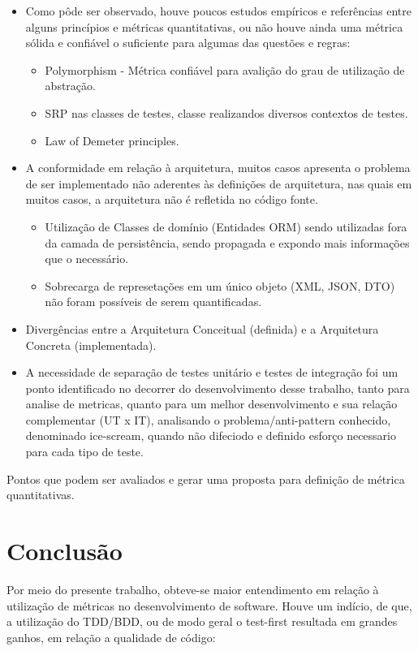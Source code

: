 \documentclass[12pt]{article}
\begin{document}
 \begin{itemize}
 	\item Como  pôde  ser  observado,  houve  poucos  estudos  empíricos e referências entre alguns princípios e métricas quantitativas, ou não houve ainda uma métrica sólida e confiável o suficiente para algumas das questões e regras:
		\begin{itemize}
		 \item Polymorphism - Métrica confiável para avalição do grau de utilização de abstração.
		 \item  SRP nas classes de testes, classe realizandos diversos contextos de testes.
		 \item Law of Demeter principles.
		\end{itemize}
	\item A conformidade em relação à arquitetura, muitos casos apresenta  o problema de ser implementado não aderentes às definições de arquitetura, nas quais  em  muitos  casos, a  arquitetura não é refletida no código fonte.
		\begin{itemize}
		 \item Utilização de Classes de domínio (Entidades ORM) sendo utilizadas fora da camada de persistência, sendo propagada e expondo mais informações que o necessário.
		 \item Sobrecarga de represetações em um único objeto (XML, JSON, DTO) não foram possíveis de serem quantificadas.
		\end{itemize}
	\item Divergências  entre  a  Arquitetura  Conceitual  (definida) e a Arquitetura  Concreta  (implementada).
    \item A necessidade de separação de testes unitário e testes de integração foi um ponto identificado no decorrer do desenvolvimento desse trabalho, tanto para analise de metricas, quanto para um melhor desenvolvimento e sua relação complementar (UT x IT), analisando o problema/anti-pattern conhecido, denominado ice-scream, quando não difeciodo e definido esforço necessario para cada tipo de teste.
\end{itemize}

Pontos que podem ser avaliados e gerar uma proposta para definição de métrica quantitativas.

\part{Conclusão} \label{sec:conclusao}

Por meio do presente trabalho, obteve-se maior entendimento em relação à utilização de métricas no desenvolvimento de software.
Houve um indício, de que, a utilização do TDD/BDD, ou de modo geral o test-first resultada em grandes ganhos, em relação a qualidade de código:
\end{document}

